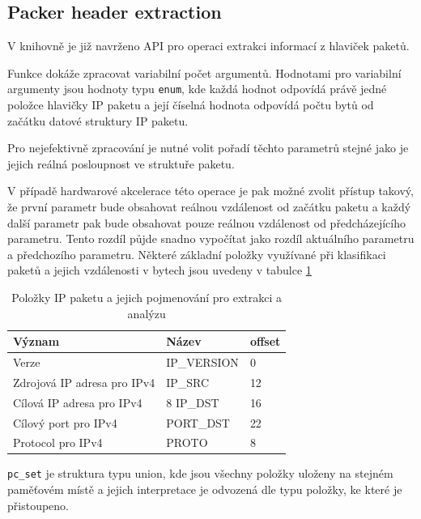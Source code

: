 \subsection{Packer header extraction}
V knihovně je již navrženo API pro operaci extrakci informací z hlaviček paketů.


Funkce dokáže zpracovat variabilní počet argumentů.
Hodnotami pro variabilní argumenty jsou hodnoty typu \texttt{enum}, kde každá hodnot odpovídá
právě jedné položce hlavičky IP paketu a její číselná hodnota odpovídá počtu bytů
od začátku datové struktury IP paketu.

Pro nejefektivně zpracování je nutné volit pořadí těchto parametrů stejné jako je jejich reálná
posloupnost ve struktuře paketu.

V případě hardwarové akcelerace této operace je pak možné zvolit přístup takový,
že první parametr bude obsahovat reálnou vzdálenost od začátku paketu a každý další parametr
pak bude obsahovat pouze reálnou vzdálenost od předcházejícího parametru. Tento rozdíl
půjde snadno vypočítat jako rozdíl aktuálního parametru a předchozího parametru.
Některé základní položky využívané při klasifikaci paketů a jejich vzdálenosti v bytech
jsou uvedeny v tabulce \ref{tab:phe}

\begin{table}[!htbp]
	\center
	\label{tab:phe}
    \begin{tabular}{|l|l|l|}
    \hline
    Význam & Název & offset \\ \hline
    Verze & IP\_VERSION & 0 \\ \hline
    Zdrojová IP adresa pro IPv4 & IP\_SRC & 12 \\ \hline
    Cílová IP adresa pro IPv4 & 8 IP\_DST & 16 \\ \hline
    Cílový port pro IPv4 & PORT\_DST & 22 \\ \hline
    Protocol pro IPv4 & PROTO & 8 \\ \hline
    \end{tabular}
	\caption{Položky IP paketu a jejich pojmenování pro extrakci a analýzu}
\end{table}

\texttt{pc\_set} je struktura typu union, kde jsou všechny položky uloženy na stejném paměťovém místě
a jejich interpretace je odvozená dle typu položky, ke které je přistoupeno.

